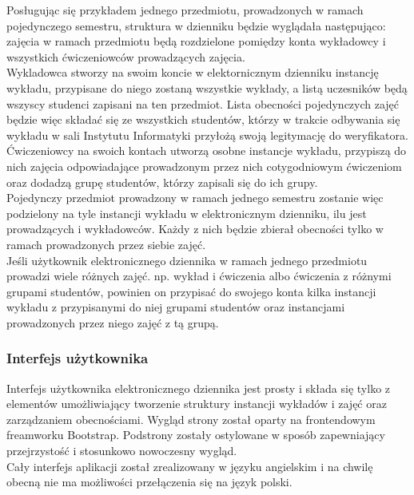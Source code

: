 \documentclass[declaration,shortabstract, mgr]{iithesis}
\begin{document}
\indent Posługując się przykładem jednego przedmiotu, prowadzonych w ramach pojedynczego semestru, struktura w dzienniku będzie wyglądała następująco: zajęcia w ramach przedmiotu będą rozdzielone pomiędzy konta wykładowcy i wszystkich ćwiczeniowców prowadzących zajęcia. \\
\indent Wykladowca stworzy na swoim koncie w elektornicznym dzienniku instancję wykładu, przypisane do niego zostaną wszystkie wykłady, a listą uczesników będą wszyscy studenci zapisani na ten przedmiot. Lista obecności pojedynczych zajęć będzie więc składać się ze wszystkich studentów, którzy w trakcie odbywania się wykładu w sali Instytutu Informatyki przyłożą swoją legitymację do weryfikatora.\\
\indent Ćwiczeniowcy na swoich kontach utworzą osobne instancje wykładu, przypiszą do nich zajęcia odpowiadające prowadzonym przez nich cotygodniowym ćwiczeniom oraz dodadzą grupę studentów, którzy zapisali się do ich grupy. \\
\indent Pojedynczy przedmiot prowadzony w ramach jednego semestru zostanie więc podzielony na tyle instancji wykładu w elektronicznym dzienniku, ilu jest prowadzących i wykładowców. Każdy z nich będzie zbierał obecności tylko w ramach prowadzonych przez siebie zajęć. \\
\indent Jeśli użytkownik elektronicznego dziennika w ramach jednego przedmiotu prowadzi wiele różnych zajęć. np. wykład i ćwiczenia albo ćwiczenia z różnymi grupami studentów, powinien on przypisać do swojego konta kilka instancji wykładu z przypisanymi do niej grupami studentów oraz instancjami prowadzonych przez niego zajęć z tą grupą.

\subsubsection{Interfejs użytkownika}
\indent Interfejs użytkownika elektronicznego dziennika jest prosty i składa się tylko z elementów umożliwiający tworzenie struktury instancji wykładów i zajęć oraz zarządzaniem obecnościami. Wygląd strony został oparty na frontendowym freamworku Bootstrap\cite{bootstrap}. 
Podstrony zostały ostylowane w sposób zapewniający przejrzystość i stosunkowo nowoczesny wygląd. \\
\indent Cały interfejs aplikacji został zrealizowany w języku angielskim i na chwilę obecną nie ma możliwości przełączenia się na język polski.\\
\end{document}
